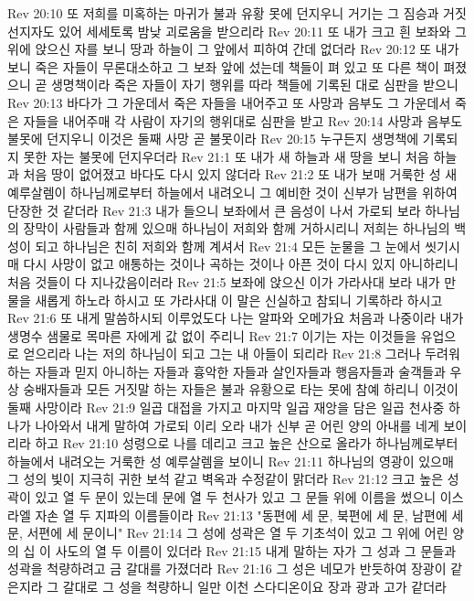 Rev 20:10  또 저희를 미혹하는 마귀가 불과 유황 못에 던지우니 거기는 그 짐승과 거짓 선지자도 있어 세세토록 밤낮 괴로움을 받으리라
Rev 20:11  또 내가 크고 흰 보좌와 그 위에 앉으신 자를 보니 땅과 하늘이 그 앞에서 피하여 간데 없더라
Rev 20:12  또 내가 보니 죽은 자들이 무론대소하고 그 보좌 앞에 섰는데 책들이 펴 있고 또 다른 책이 펴졌으니 곧 생명책이라 죽은 자들이 자기 행위를 따라 책들에 기록된 대로 심판을 받으니
Rev 20:13  바다가 그 가운데서 죽은 자들을 내어주고 또 사망과 음부도 그 가운데서 죽은 자들을 내어주매 각 사람이 자기의 행위대로 심판을 받고
Rev 20:14  사망과 음부도 불못에 던지우니 이것은 둘째 사망 곧 불못이라
Rev 20:15  누구든지 생명책에 기록되지 못한 자는 불못에 던지우더라
Rev 21:1  또 내가 새 하늘과 새 땅을 보니 처음 하늘과 처음 땅이 없어졌고 바다도 다시 있지 않더라
Rev 21:2  또 내가 보매 거룩한 성 새 예루살렘이 하나님께로부터 하늘에서 내려오니 그 예비한 것이 신부가 남편을 위하여 단장한 것 같더라
Rev 21:3  내가 들으니 보좌에서 큰 음성이 나서 가로되 보라 하나님의 장막이 사람들과 함께 있으매 하나님이 저희와 함께 거하시리니 저희는 하나님의 백성이 되고 하나님은 친히 저희와 함께 계셔서
Rev 21:4  모든 눈물을 그 눈에서 씻기시매 다시 사망이 없고 애통하는 것이나 곡하는 것이나 아픈 것이 다시 있지 아니하리니 처음 것들이 다 지나갔음이러라
Rev 21:5  보좌에 앉으신 이가 가라사대 보라 내가 만물을 새롭게 하노라 하시고 또 가라사대 이 말은 신실하고 참되니 기록하라 하시고
Rev 21:6  또 내게 말씀하시되 이루었도다 나는 알파와 오메가요 처음과 나중이라 내가 생명수 샘물로 목마른 자에게 값 없이 주리니
Rev 21:7  이기는 자는 이것들을 유업으로 얻으리라 나는 저의 하나님이 되고 그는 내 아들이 되리라
Rev 21:8  그러나 두려워하는 자들과 믿지 아니하는 자들과 흉악한 자들과 살인자들과 행음자들과 술객들과 우상 숭배자들과 모든 거짓말 하는 자들은 불과 유황으로 타는 못에 참예 하리니 이것이 둘째 사망이라
Rev 21:9  일곱 대접을 가지고 마지막 일곱 재앙을 담은 일곱 천사중 하나가 나아와서 내게 말하여 가로되 이리 오라 내가 신부 곧 어린 양의 아내를 네게 보이리라 하고
Rev 21:10  성령으로 나를 데리고 크고 높은 산으로 올라가 하나님께로부터 하늘에서 내려오는 거룩한 성 예루살렘을 보이니
Rev 21:11  하나님의 영광이 있으매 그 성의 빛이 지극히 귀한 보석 같고 벽옥과 수정같이 맑더라
Rev 21:12  크고 높은 성곽이 있고 열 두 문이 있는데 문에 열 두 천사가 있고 그 문들 위에 이름을 썼으니 이스라엘 자손 열 두 지파의 이름들이라
Rev 21:13  "동편에 세 문, 북편에 세 문, 남편에 세 문, 서편에 세 문이니"
Rev 21:14  그 성에 성곽은 열 두 기초석이 있고 그 위에 어린 양의 십 이 사도의 열 두 이름이 있더라
Rev 21:15  내게 말하는 자가 그 성과 그 문들과 성곽을 척량하려고 금 갈대를 가졌더라
Rev 21:16  그 성은 네모가 반듯하여 장광이 같은지라 그 갈대로 그 성을 척량하니 일만 이천 스다디온이요 장과 광과 고가 같더라
